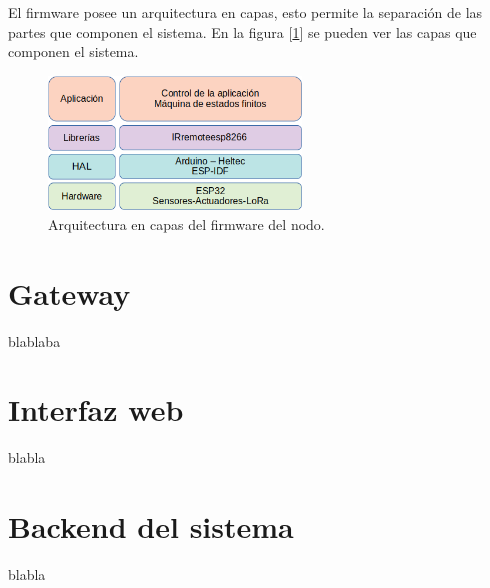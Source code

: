 El firmware posee un arquitectura en capas, esto permite la separación de las partes que componen el sistema. En la figura [\ref{fig:capas}] se pueden ver las capas que componen el sistema.

\begin{figure}[h!]
	\centering
	\includegraphics[width=0.6\textwidth]{./Figures/capas.png}
	\caption{Arquitectura en capas del firmware del nodo.}
	\label{fig:capas}
\end{figure}












\section{Gateway}
\label{sec:gateway}

blablaba

\section{Interfaz web}

blabla

\section{Backend del sistema}

blabla

